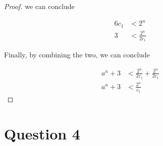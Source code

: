\documentclass[12pt]{article}
\begin{document}
\begin{itemize}
\begin{proof}
        we can conclude

        \begin{align}
            6c_1 &< 2^n\\
            3 &< \frac{2^n}{2c_1}
        \end{align}

        \bigskip

        Finally, by combining the two, we can conclude

        \begin{align}
            a^n + 3 &< \frac{2^n}{2c_1} + \frac{2^n}{2c_1}\\
            a^n + 3 &< \frac{2^n}{c_1}
        \end{align}
    \end{proof}

 \end{itemize}

\section*{Question 4}
\end{document}
